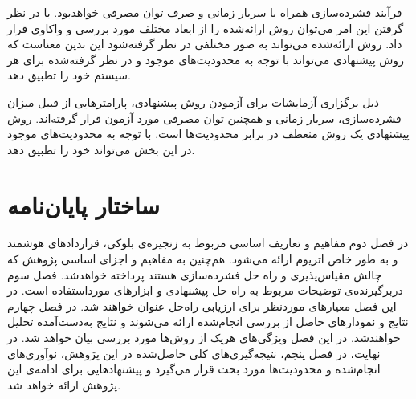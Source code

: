 فرآیند فشرده‌سازی همراه با سربار زمانی و صرف توان مصرفی خواهدبود. با در نظر گرفتن این امر می‌توان روش ارائه‌شده را از ابعاد مختلف مورد بررسی و واکاوی قرار داد. روش ارائه‌شده می‌تواند به صور مختلفی در نظر گرفته‌شود این بدین معناست که روش پیشنهادی می‌تواند با توجه به محدودیت‌های موجود و در نظر گرفته‌شده برای هر سیستم خود را تطبیق دهد.

ذیل برگزاری آزمایشات برای آزمودن روش پیشنهادی، پارامترهایی از قببل میزان فشرده‌سازی، سربار زمانی و همچنین توان مصرفی مورد آزمون قرار گرفته‌اند. روش پیشنهادی یک روش منعطف در برابر محدودیت‌ها است. با توجه به محدودیت‌های موجود در این بخش می‌تواند خود را تطبیق دهد.

\section{ساختار پایان‌نامه}
در فصل دوم مفاهیم و تعاریف اساسی مربوط به زنجیره‌ی بلوکی، قراردادهای هوشمند و به طور خاص اتریوم ارائه می‌شود. هم‌چنین به مفاهیم و اجزای اساسی پژوهش که چالش مقیاس‌پذیری و راه حل فشرده‌سازی هستند پرداخته خواهدشد.
فصل سوم دربرگیرنده‌ی توضیحات مربوط به راه حل پیشنهادی و ابزارهای مورداستفاده است. در این فصل معیارهای موردنظر برای ارزیابی راه‌حل عنوان خواهند شد.
در فصل چهارم نتایج و نمودارهای حاصل از بررسی انجام‌شده ارائه می‌شوند و نتایج به‌دست‌آمده تحلیل خواهندشد. در این فصل ویژگی‌های هریک از روش‌ها مورد بررسی بیان خواهد شد.
در نهایت، در فصل پنجم، نتیجه‌گیری‌های کلی حاصل‌شده در این پژوهش، نوآوری‌های انجام‌شده و محدودیت‌ها مورد بحث قرار می‌گیرد و پیشنهادهایی برای ادامه‌ی این پژوهش ارائه خواهد شد.